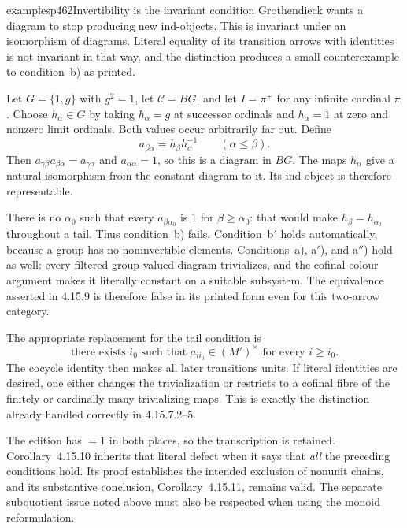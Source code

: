 \begin{dcomment}{examples}{p462}{Invertibility is the invariant condition}
Grothendieck wants a diagram to stop producing new ind-objects. This is invariant under an isomorphism of diagrams. Literal equality of its transition arrows with identities is not invariant in that way, and the distinction produces a small counterexample to condition~b) as printed.

Let $G=\{1,g\}$ with $g^2=1$, let $\mathcal C=BG$, and let $I=\pi^+$ for any infinite cardinal $\pi$. Choose $h_\alpha\in G$ by taking $h_\alpha=g$ at successor ordinals and $h_\alpha=1$ at zero and nonzero limit ordinals. Both values occur arbitrarily far out. Define
\[
a_{\beta\alpha}=h_\beta h_\alpha^{-1}\qquad(\alpha\le\beta).
\]
Then $a_{\gamma\beta}a_{\beta\alpha}=a_{\gamma\alpha}$ and $a_{\alpha\alpha}=1$, so this is a diagram in $BG$. The maps $h_\alpha$ give a natural isomorphism from the constant diagram to it. Its ind-object is therefore representable.

There is no $\alpha_0$ such that every $a_{\beta\alpha_0}$ is $1$ for $\beta\ge\alpha_0$: that would make $h_\beta=h_{\alpha_0}$ throughout a tail. Thus condition~b) fails. Condition~b$'$ holds automatically, because a group has no noninvertible elements. Conditions~a), a$'$), and a$''$) hold as well: every filtered group-valued diagram trivializes, and the cofinal-colour argument makes it literally constant on a suitable subsystem. The equivalence asserted in 4.15.9 is therefore false in its printed form even for this two-arrow category.

The appropriate replacement for the tail condition is
\[
\text{there exists }i_0\text{ such that }
a_{ii_0}\in (M')^\times\text{ for every }i\ge i_0.
\]
The cocycle identity then makes all later transitions units. If literal identities are desired, one either changes the trivialization or restricts to a cofinal fibre of the finitely or cardinally many trivializing maps. This is exactly the distinction already handled correctly in 4.15.7.2--5.

The edition has $=1$ in both places, so the transcription is retained. Corollary~4.15.10 inherits that literal defect when it says that \emph{all} the preceding conditions hold. Its proof establishes the intended exclusion of nonunit chains, and its substantive conclusion, Corollary~4.15.11, remains valid. The separate subquotient issue noted above must also be respected when using the monoid reformulation.
\end{dcomment}

